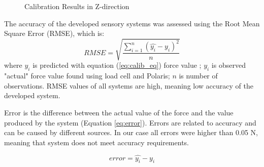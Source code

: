 \begin{figure}[h]%
\centering
{}%
\qquad
{}%
\caption{Calibration Results in Z-direction}
\label{fig:Z_calib_res}%
\end{figure}

The accuracy of the developed sensory systems was assessed using the Root Mean Square Error (RMSE), which is:
\begin{equation}
RMSE = \sqrt{\frac{\sum_{i=1}^{n}{{(\hat{y_i} - y_i)}^2}}{n}}
\end{equation}
where $\hat{y_i}$ is predicted with equation (\ref{eq:calib_eq}) force value ; $y_i$ is observed "actual" force value found using load cell and Polaris; $n$ is number of observations.
RMSE values of all systems are high, meaning low accuracy of the developed system.

Error is the difference between the actual value of the force and the value produced by the system (Equation \ref{eq:error}). Errors are related to accuracy and can be caused by different sources. In our case all errors were higher than 0.05 N, meaning that system does not meet accuracy requirements.

\begin{equation}\label{eq:error}
error = \hat{y_i} - y_i
\end{equation}

